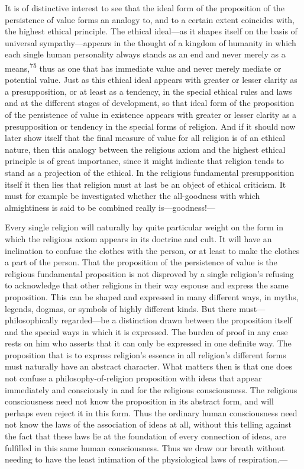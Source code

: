 \documentclass[12pt,a4paper]{book}
\newcommand{\opage}[1]{\marginnote{\footnotesize\textit{[#1]}}}
\begin{document}
It is of distinctive interest to see that the ideal form of the proposition of the persistence of value
forms an analogy to, and to a certain extent coincides with, the highest ethical principle. The ethical
ideal---as it shapes itself on the basis of universal sympathy---appears in the thought of a kingdom of
humanity 
\opage{151}in which each single human personality always stands as an end and never merely as a
means,\textsuperscript{75} thus as one that has immediate value and never merely mediate or potential
value. Just as this ethical ideal appears with greater or lesser clarity as a presupposition, or at least
as a tendency, in the special ethical rules and laws and at the different stages of development, so that
ideal form of the proposition of the persistence of value in existence appears with greater or lesser
clarity as a presupposition or tendency in the special forms of religion. And if it should now later show
itself that the final measure of value for all religion is of an ethical nature, then this analogy between
the religious axiom and the highest ethical principle is of great importance, since it might indicate that
religion tends to stand as a projection of the ethical. In the religious fundamental presupposition itself
it then lies that religion must at last be an object of ethical criticism. It must for example be
investigated whether the all-goodness with which almightiness is said to be combined really is---goodness!---

Every single religion will naturally lay quite particular weight on the form in which the religious axiom
appears in its doctrine and cult. It will have an inclination to confuse the clothes with the person, or at
least to make the clothes a part of the person. That the proposition of the persistence of value is the
religious fundamental proposition is not disproved by a single religion's refusing to acknowledge that
other religions in their way espouse and express the same proposition. This can be shaped and expressed in
many different ways, in myths, legends, dogmas, or symbols of highly different kinds. But there must---
philosophically regarded---be a distinction drawn between the proposition itself and the special ways in
which it is expressed. The burden of proof in any case rests on him who asserts that it can only be
expressed in one definite way. The proposition that is to express religion's essence in all religion's
different forms must naturally have an abstract character. What matters then is that one does not confuse a
philosophy-of-religion proposition with ideas that appear immediately and consciously in and for the
religious consciousness. The religious consciousness need not know the proposition in its abstract form, and
will perhaps even reject it in this form. Thus the ordinary human consciousness need not know the laws of
the association of ideas at all, without this telling against the fact that these laws lie at the foundation
of every connection of ideas, 
\opage{152}are fulfilled in this same human consciousness. Thus we draw our breath
without needing to have the least intimation of the physiological laws of respiration.---
\end{document}

